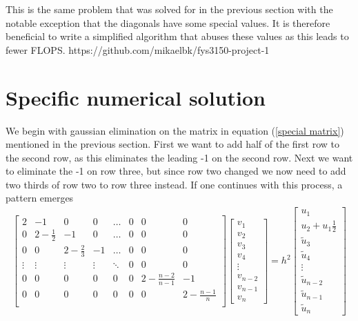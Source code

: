 \documentclass[10pt,a4paper]{article}
\begin{document}
    This is the same problem that was solved for in the previous section with the notable exception that the diagonals have some special values. It is therefore beneficial to write a simplified algorithm that abuses these values as this leads to fewer FLOPS.
https://github.com/mikaelbk/fys3150-project-1
	\newpage
    \section{Specific numerical solution}
    We begin with gaussian elimination on the matrix in equation (\ref{special matrix}) mentioned in the previous section. First we want to add half of the first row to the second row, as this eliminates the leading -1 on the second row. Next we want to eliminate the -1 on row three, but since row two changed we now need to add two thirds of row two to row three instead. If one continues with this process, a pattern emerges
    \begin{align*}
    \begin{bmatrix}
    2 & -1 & 0 & 0 & \dots & 0 & 0 & 0 \\
    0 & 2-\tfrac{1}{2} & -1 & 0 & \dots & 0 & 0 & 0 \\
    0 & 0 & 2-\tfrac{2}{3} & -1 & \dots & 0 & 0 & 0 \\
    \vdots & \vdots & \vdots & \vdots & \ddots & 0 & 0 & 0 \\
    0 & 0 & 0 & 0 & 0 & 0 & 2 - \tfrac{n-2}{n-1} & -1\\
    0 & 0 & 0 & 0 & 0 & 0 & 0 & 2 - \tfrac{n-1}{n} \\
    \end{bmatrix}
    \begin{bmatrix}
        v_1\\ v_2 \\ v_3 \\ v_4 \\ \vdots \\ v_{n-2} \\v_{n-1} \\ v_{n}
    \end{bmatrix}
    =h^2
    \begin{bmatrix}
        u_1 \\ u_2 + u_1\tfrac{1}{2} \\ \tilde{u}_3 \\ \tilde{u}_4 \\ \vdots \\ \tilde{u}_{n-2} \\ \tilde{u}_{n-1} \\ \tilde{u}_{n}
    \end{bmatrix}
    \end{align*}
\end{document}

